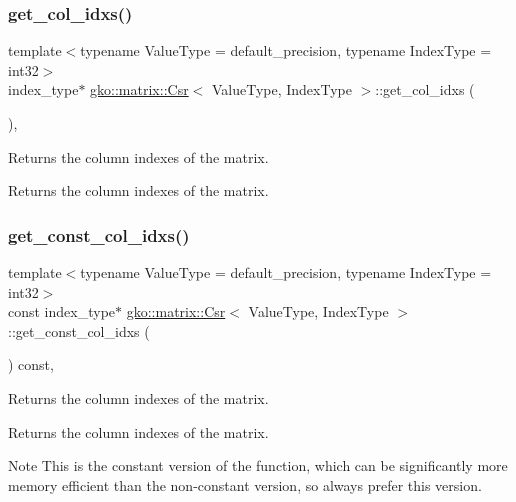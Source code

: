 \subsubsection{\texorpdfstring{get\+\_\+col\+\_\+idxs()}{get\_col\_idxs()}}
{\footnotesize\ttfamily template$<$typename Value\+Type = default\+\_\+precision, typename Index\+Type = int32$>$ \\
index\+\_\+type$\ast$ \hyperlink{classgko_1_1matrix_1_1Csr}{gko\+::matrix\+::\+Csr}$<$ Value\+Type, Index\+Type $>$\+::get\+\_\+col\+\_\+idxs (\begin{DoxyParamCaption}{ }\end{DoxyParamCaption})\hspace{0.3cm}{\ttfamily [inline]}, {\ttfamily [noexcept]}}



Returns the column indexes of the matrix. 

\begin{DoxyReturn}{Returns}
the column indexes of the matrix. 
\end{DoxyReturn}
\mbox{\label{classgko_1_1matrix_1_1Csr_ac9d640d26449e0ee46c7cb2b80100d65}} 
\subsubsection{\texorpdfstring{get\+\_\+const\+\_\+col\+\_\+idxs()}{get\_const\_col\_idxs()}}
{\footnotesize\ttfamily template$<$typename Value\+Type = default\+\_\+precision, typename Index\+Type = int32$>$ \\
const index\+\_\+type$\ast$ \hyperlink{classgko_1_1matrix_1_1Csr}{gko\+::matrix\+::\+Csr}$<$ Value\+Type, Index\+Type $>$\+::get\+\_\+const\+\_\+col\+\_\+idxs (\begin{DoxyParamCaption}{ }\end{DoxyParamCaption}) const\hspace{0.3cm}{\ttfamily [inline]}, {\ttfamily [noexcept]}}



Returns the column indexes of the matrix. 

\begin{DoxyReturn}{Returns}
the column indexes of the matrix.
\end{DoxyReturn}
\begin{DoxyNote}{Note}
This is the constant version of the function, which can be significantly more memory efficient than the non-\/constant version, so always prefer this version. 
\end{DoxyNote}
\mbox{\label{classgko_1_1matrix_1_1Csr_a50c9ce521649450d7ae5ff488e42c190}} 
